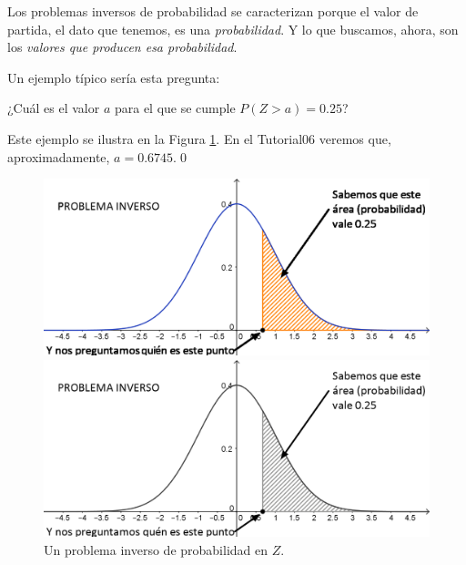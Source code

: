 Los {\sf problemas inversos} de probabilidad se
caracterizan porque el valor de partida, el dato que tenemos, es una {\em
probabilidad}. Y lo que buscamos, ahora, son los {\em valores que producen esa
probabilidad}.

\begin{ejemplo}
\label{cap06:ejem:ProblemaInversoProbabilidadZ}
Un ejemplo típico sería esta pregunta:
\begin{center}
¿Cuál es el valor $a$ para el que se cumple $P(Z>a)=0.25$?
\end{center}
Este ejemplo se ilustra en la Figura \ref{cap06:fig:ProblemaInversoZ}. En el Tutorial06 veremos que, aproximadamente, $a = 0.6745$.\qed
\begin{figure}[h!]
\begin{center}
\begin{enColor}
\includegraphics[width=13cm]{../fig/Cap06-ProblemaInversoZ-01.png}
\end{enColor}
\begin{bn}
\includegraphics[width=13cm]{../fig/Cap06-ProblemaInversoZ-01-bn.png}
\end{bn}
\caption{Un problema inverso de probabilidad en $Z$.}
\label{cap06:fig:ProblemaInversoZ}
\end{center}
\end{figure}
\end{ejemplo}

